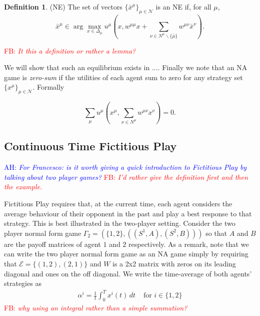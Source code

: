 \documentclass{article}
\theoremstyle{definition}
\newtheorem*{definition}{Definition}
\newcommand{\ah}[1]{\textcolor{blue}{AH: \textit{#1}}}
\newcommand{\fb}[1]{\textcolor{red}{FB: \textit{#1}}}
\newcommand{\agentset}{\mathcal{N}}
\newcommand{\edgeset}{\mathcal{E}}
\newcommand{\weightset}{W}
\newcommand{\wmunu}{w^{\mu \nu}}
\newcommand{\xmu}{x^{\mu}}
\newcommand{\xnu}{x^{\nu}}
\newcommand{\NE}[1]{\bar{x}^{#1}}
\newcommand{\weightedsum}{ \sum_{\nu \in N^\mu} \wmunu \xnu}
\begin{document}
	\begin{definition}(NE)
		The set of vectors $\{ \NE{\mu}\}_{\mu \in \agentset}$ is an NE if, for all $\mu$,	
		\begin{equation*}
		\NE{\mu} \in \arg \max_{x \in \Delta_\mu} u^\mu(x, w^{\mu \mu} x + \sum_{\nu \in N^\mu \backslash \{\bar{\mu}\}} \wmunu \NE{\nu}).
		\end{equation*}	
	\end{definition}
        \fb{It this a definition or rather a lemma?}

	We will show that such an equilibrium exists in .... Finally we note that an NA game is \emph{zero-sum} if the utilities of each agent sum to zero for any strategy set $\{ \xmu \}_{\mu \in \agentset}$. Formally

	\begin{equation}
		\sum_\mu u^\mu(\xmu, \weightedsum) = 0.
	\end{equation}

	\subsection{Continuous Time Fictitious Play}
	\label{sec::CTFP}

	\ah{For Francesco: is it worth giving a quick introduction to Fictitious Play by talking about two player games?}
\fb{I'd rather give the definition first and then the example.}
        

	Fictitious Play requires that, at the current time, each agent
        considers the average behaviour of their opponent in the past
        and play a best response to that strategy. This is best
        illustrated in the two-player setting. Consider the two player
        normal form game $\Gamma_2 = (\{ 1, 2\}, ((S^1, A), (S^2,
        B)))$ so that $A$ and $B$ are the payoff matrices of agent $1$
        and $2$ respectively. As a remark, note that we can write the
        two player normal form game as an NA game simply by requiring
        that $\edgeset = \{(1, 2), (2, 1)\}$ and $\weightset$ is a 2x2
        matrix with zeros on its leading diagonal and ones on the off
        diagonal. We write the time-average of both agents' strategies
        as
%
	\begin{align}
		\alpha^i = \frac{1}{t} \int_0^T x^i(t) \, dt & \text{ for $i \in \{1, 2\}$}
	\end{align}
        \fb{why using an integral rather than a simple summation?}
\end{document}
